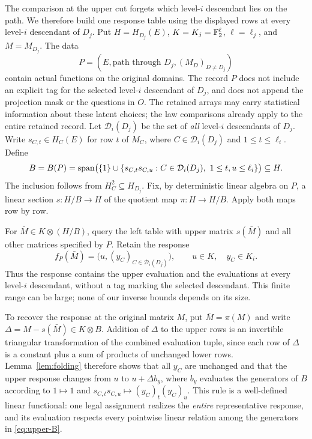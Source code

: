 The comparison at the upper cut forgets which level-$i$ descendant lies on
the path.  We therefore build one response table using the displayed rows
at every level-$i$ descendant of $D_j$.
Put $H=H_{D_j}(E)$, $K=K_j=\mathbb F_2^{\ell}$, $\ell=\ell_j$, and
$M=M_{D_j}$.  The data
\[
 P=(E,\text{path through }D_j,(M_D)_{D\ne D_j})
\]
contain actual functions on the original domains.  The record $P$ does
not include an explicit tag for the selected level-$i$ descendant of $D_j$,
and does not append the projection mask or the questions in $O$.
The retained arrays may carry statistical information about these latent
choices; the law comparisons already apply to the entire retained record.
Let $\mathcal D_i(D_j)$ be the set of \emph{all} level-$i$ descendants of
$D_j$.  Write $s_{C,t}\in H_C(E)$ for row $t$ of $M_C$, where
$C\in\mathcal D_i(D_j)$ and $1\le t\le\ell_i$.  Define
\begin{equation}\label{eq:upper-B}
 B=B(P)=\operatorname{span}\bigl(\{1\}\cup
       \{s_{C,t}s_{C,u}:C\in\mathcal D_i(D_j),\ 1\le t,u\le\ell_i\}\bigr)
       \subseteq H.
\end{equation}
The inclusion follows from $H_C^2\subseteq H_{D_j}$.  Fix, by deterministic
linear algebra on $P$, a linear section $s:H/B\longrightarrow H$ of the
quotient map $\pi:H\longrightarrow H/B$.  Apply both maps row by row.

For $\bar M\in K\otimes(H/B)$, query the left table with upper matrix
$s(\bar M)$ and all other matrices specified by $P$.  Retain the response
\begin{equation}\label{eq:upper-representative}
 f_P(\bar M)=\bigl(u,(y_C)_{C\in\mathcal D_i(D_j)}\bigr),
 \qquad u\in K,\quad y_C\in K_i.
\end{equation}
Thus the response contains the upper evaluation and the evaluations at every
level-$i$ descendant, without a tag marking the selected descendant.  This
finite range can be large; none of our inverse bounds depends on its size.

To recover the response at the original matrix $M$, put $\bar M=\pi(M)$ and write
$\Delta=M-s(\bar M)\in K\otimes B$.  Addition of $\Delta$ to the upper
rows is an invertible triangular transformation of the combined evaluation
tuple, since each row of $\Delta$ is a constant plus a sum of products of
unchanged lower rows.  Lemma~\ref{lem:folding} therefore shows that all
$y_C$ are unchanged and that the upper response changes from $u$ to
$u+\Delta b_y$, where $b_y$ evaluates the generators of $B$ according to
$1\mapsto1$ and $s_{C,t}s_{C,u}\mapsto (y_C)_t(y_C)_u$.
This rule is a well-defined linear functional: one legal assignment realizes
the \emph{entire} representative response, and its evaluation respects every
pointwise linear relation among the generators in \eqref{eq:upper-B}.

